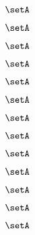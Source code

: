 \begin{forslides}
    \begin{equation}
        \label{eq:slides-processes-132}
        \setA
    \end{equation}

    \begin{equation}
        \label{eq:slides-processes-133}
        \setA
    \end{equation}

    \begin{equation}
        \label{eq:slides-processes-134}
        \setA
    \end{equation}

    \begin{equation}
        \label{eq:slides-processes-135}
        \setA
    \end{equation}

    \begin{equation}
        \label{eq:slides-processes-136}
        \setA
    \end{equation}

    \begin{equation}
        \label{eq:slides-processes-137}
        \setA
    \end{equation}

    \begin{equation}
        \label{eq:slides-processes-138}
        \setA
    \end{equation}

    \begin{equation}
        \label{eq:slides-processes-139}
        \setA
    \end{equation}

    \begin{equation}
        \label{eq:slides-processes-140}
        \setA
    \end{equation}

    \begin{equation}
        \label{eq:slides-processes-141}
        \setA
    \end{equation}

    \begin{equation}
        \label{eq:slides-processes-142}
        \setA
    \end{equation}

    \begin{equation}
        \label{eq:slides-processes-143}
        \setA
    \end{equation}

    \begin{equation}
        \label{eq:slides-processes-144}
        \setA
    \end{equation}


\end{forslides}
